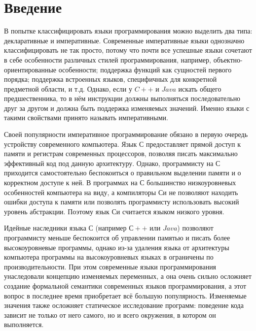 \documentclass[14pt]{matmex-diploma-custom}
\begin{document}
\sloppy

\tableofcontents

\newpage
\section{Введение}
В попытке классифицировать языки программирования можно выделить два типа: декларативные и императивные. Современные императивные языки однозначно классифицировать не так просто, потому что почти все успешные языки сочетают в себе особенности различных стилей программирования, например, объектно-ориентированные особенности; поддержка функций как сущностей первого порядка; поддержка встроенных языков, специфичных для конкретной предметной области, и т.д. Однако, если у $C++$ и $Java$ искать общего предшественника, то в нём инструкции должны выполняться последовательно друг за другом и должна быть поддержка изменяемых значений. Именно языки с такими свойствами принято называть императивными.

Своей популярности императивное программирование обязано в первую очередь устройству современного компьютера. Язык С предоставляет прямой доступ к памяти и регистрам современных процессоров, позволяя писать максимально эффективный код под данную архитектуру. Однако, программисту на С приходится самостоятельно беспокоиться о правильном выделении памяти и о корректном доступе к ней. В программах на С большинство низкоуровневых особенностей компьютера на виду, а компиляторы Си не позволяют находить ошибки доступа к памяти или позволять программисту использовать высокий уровень абстракции. Поэтому язык Си считается языком низкого уровня.

Идейные наследники языка С (например $С++$ или $Java$) позволяют программисту меньше беспокоится об управлении памятью и писать более высокоуровневые программы, однако из-за удаления языка от архитектуры компьютера программы на высокоуровневых языках в ограничены по производительности. При этом современные языки программирования унаследовали концепцию изменяемых переменных, а она очень сильно осложняет создание формальной семантики современных языков программирования, а этот вопрос в последнее время приобретает всё большую популярность. Изменяемые значения также осложняет статическое исследование программ: поведение кода зависит не только от него самого, но и всего окружения, в котором он выполняется.
\end{document}
